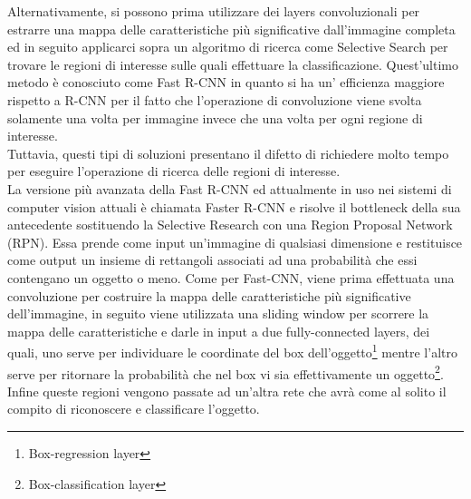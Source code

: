 Alternativamente, si possono prima utilizzare dei layers convoluzionali per estrarre una mappa delle caratteristiche più significative dall'immagine completa ed in seguito applicarci sopra un algoritmo di ricerca come Selective Search per trovare le regioni di interesse sulle quali effettuare la classificazione. Quest'ultimo metodo è conosciuto come Fast R-CNN\cite{fastRCNN} in quanto si ha un' efficienza maggiore rispetto a R-CNN per il fatto che l'operazione di convoluzione viene svolta solamente una volta per immagine invece che una volta per ogni regione di interesse.\\
Tuttavia, questi tipi di soluzioni presentano il difetto di richiedere molto tempo per eseguire l'operazione di ricerca delle regioni di interesse.\\
La versione più avanzata della Fast R-CNN ed attualmente in uso nei sistemi di computer vision attuali è chiamata Faster R-CNN\cite{fasterRCNN} e risolve il bottleneck della sua antecedente sostituendo la Selective Research con una Region Proposal Network (RPN). Essa prende come input un'immagine di qualsiasi dimensione e restituisce come output un insieme di rettangoli associati ad una probabilità che essi contengano un oggetto o meno. Come per Fast-CNN, viene prima effettuata una convoluzione per costruire la mappa delle caratteristiche più significative dell'immagine, in seguito viene utilizzata una sliding window per scorrere la mappa delle caratteristiche e darle in input a due fully-connected layers, dei quali, uno serve per individuare le coordinate del box dell'oggetto\footnote{Box-regression layer} mentre l'altro serve per ritornare la probabilità che nel box vi sia effettivamente un oggetto\footnote{Box-classification layer}. Infine queste regioni vengono passate ad un'altra rete che avrà come al solito il compito di riconoscere e classificare l'oggetto.
